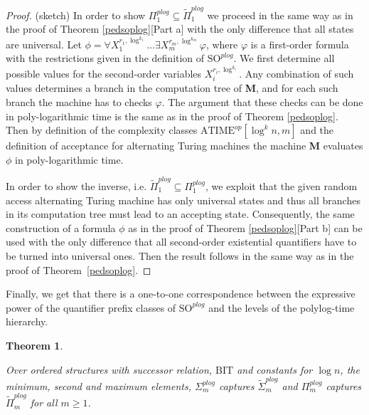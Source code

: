 \documentclass{article}
\newtheorem{theorem}{Theorem}
\begin{document}
\begin{proof}(sketch)
In order to show $\Pi^{\mathit{plog}}_1 \subseteq \tilde{\Pi}^{\mathit{plog}}_1$ we proceed in the same way as in the proof of Theorem \ref{pedsoplog}[Part a] with the only difference that all states are universal. Let $\phi = \forall X_1^{r_1,\log^{k_1}} \dots \exists X_m^{r_m,\log^{k_m}} \varphi$, where $\varphi$ is a first-order formula with the restrictions given in the definition of $\mathrm{SO}^{\mathit{plog}}$. We first determine all possible values for the second-order variables $X_i^{r_i,\log^{k_i}}$. Any combination of such values determines a branch in the computation tree of \textbf{M}, and for each such branch the machine has to checks $\varphi$. The argument that these checks can be done in poly-logarithmic time is the same as in the proof of Theorem \ref{pedsoplog}. Then by definition of the complexity classes $\mathrm{ATIME}^{op}[\log^k n,m]$ and the definition of acceptance for alternating Turing machines the machine \textbf{M} evaluates $\phi$ in poly-logarithmic time.

In order to show the inverse, i.e. $\tilde{\Pi}^{\mathit{plog}}_1 \subseteq \Pi^{\mathit{plog}}_1$, we exploit that the given random access alternating Turing machine has only universal states and thus all branches in its computation tree must lead to an accepting state. Consequently, the same construction of a formula $\phi$ as in the proof of Theorem \ref{pedsoplog}[Part b] can be used with the only difference that all second-order existential quantifiers have to be turned into universal ones. Then the result follows in the same way as in the proof of Theorem~\ref{pedsoplog}.
\end{proof}

Finally, we get that there is a one-to-one correspondence between the expressive power of the quantifier prefix classes of $\mathrm{SO}^{\mathit{plog}}$ and the levels of the polylog-time hierarchy. 

\begin{theorem}\label{pedsoplog3}

Over ordered structures with successor relation, $\mathrm{BIT}$ and constants for $\log n$, the minimum, second and maximum elements, $\Sigma^{\mathit{plog}}_m$ captures $\tilde{\Sigma}^{\mathit{plog}}_m$ and $\Pi^{\mathit{plog}}_m$ captures $\tilde{\Pi}^{\mathit{plog}}_m$ for all $m \ge 1$.

\end{theorem}
\end{document}
